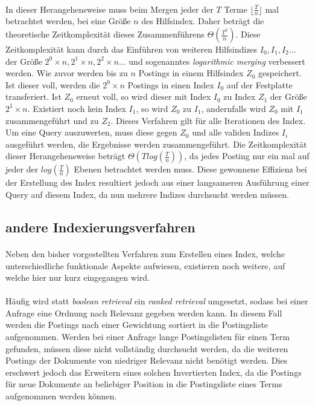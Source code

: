 \paragraph{}
In dieser Herangehensweise muss beim Mergen jeder der  $T$ Terme $ \lfloor \frac{T}{n}\rfloor$ mal betrachtet werden, bei eine Größe $n$ des Hilfsindex. Daher beträgt die theoretische Zeitkomplexität dieses Zusammenführens $\Theta(\frac{T^2}{n})$. Diese Zeitkomplexität kann durch das Einführen von weiteren Hilfsindizes $I_0 , I_1 , I_2  \dots $ der Größe $2^0 \times n, 2^1 \times n, 2^2 \times n\dots$ und sogenanntes \textit{logarithmic merging} verbessert werden. Wie zuvor werden bis zu $n$ Postings in einem Hilfsindex $Z_0$ gespeichert. Ist dieser voll, werden die $2^0 \times n$ Postings in einen Index $I_0$ auf der Festplatte transferiert. Ist $Z_0$ erneut voll, so wird dieser mit Index $I_0$ zu Index $Z_1$ der Größe $2^1 \times n$. Existiert noch kein Index $I_1$, so wird $Z_0$ zu $I_1$, andernfalls wird $Z_0$ mit $I_1$ zusammengeführt und zu $Z_2$. Dieses Verfahren gilt für alle Iterationen des Index. Um eine Query auszuwerten, muss diese gegen $Z_0$ und alle validen Indizes $I_i$ ausgeführt werden, die Ergebnisse werden zusammengeführt. Die Zeitkomplexität dieser Herangehensweise beträgt $\Theta (T log(\frac{T}{n}))$, da jedes Posting nur ein mal auf jeder der $log(\frac{T}{n})$ Ebenen betrachtet werden muss. Diese gewonnene Effizienz bei der Erstellung des Index resultiert jedoch aus einer langsameren Ausführung einer Query auf diesem Index, da nun mehrere Indizes durchsucht werden müssen.\par

\subsection{andere Indexierungsverfahren}
\paragraph{}
Neben den bisher vorgestellten Verfahren zum Erstellen eines Index, welche unterschiedliche funktionale Aspekte aufwiesen, existieren noch weitere, auf welche hier nur kurz eingegangen wird.\par

\paragraph{}
Häufig wird statt \textit{boolean retrieval} ein \textit{ranked retrieval} umgesetzt, sodass bei einer Anfrage eine Ordnung nach Relevanz gegeben werden kann. In diesem Fall werden die Postings nach einer Gewichtung sortiert in die Postingsliste aufgenommen. Werden bei einer Anfrage lange Postingslisten für einen Term gefunden, müssen diese nicht vollständig durchsucht werden, da die weiteren Postings der Dokumente von niedriger Relevanz nicht benötigt werden. Dies erschwert jedoch das Erweitern eines solchen Invertierten Index, da die Postings für neue Dokumente an beliebiger Position in die Postingsliste eines Terms aufgenommen werden können.\par

